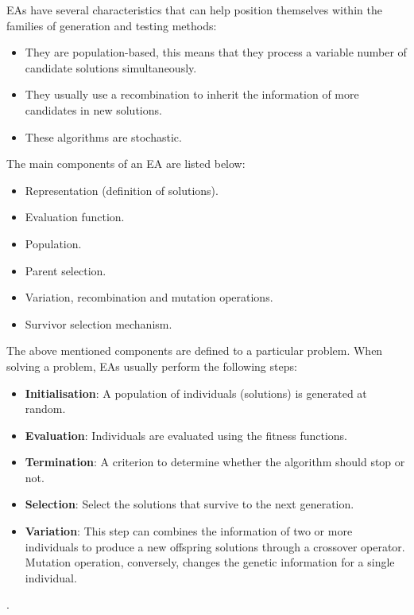

EAs have several characteristics that can help position themselves within the families of generation and testing methods:

\begin{itemize}
    \item They are population-based, this means that they process a variable number of candidate solutions simultaneously.
    \item They usually use a recombination to inherit the information of more candidates in new solutions.
    \item These algorithms are stochastic.
\end{itemize}

The main components of an EA are listed below:

\begin{itemize}
    \item Representation (definition of solutions).
    \item Evaluation function.
    \item Population.
    \item Parent selection.
    \item Variation, recombination and mutation operations.
    \item Survivor selection mechanism.
\end{itemize}

The above mentioned components are defined to a particular problem. When solving a problem, EAs usually perform the following steps:\\

\begin{itemize}
\item \textbf{Initialisation}: A population of individuals (solutions) is generated at random.
\item \textbf{Evaluation}: Individuals are evaluated using the fitness functions.
\item \textbf{Termination}: A criterion to determine whether the algorithm should stop or not.
\item \textbf{Selection}: Select the solutions that survive to the next generation.
\item \textbf{Variation}: This step can combines the information of two or more individuals to produce a new offspring solutions through a crossover operator. Mutation operation, conversely, changes the genetic information for a single individual.
\end{itemize}.\\

